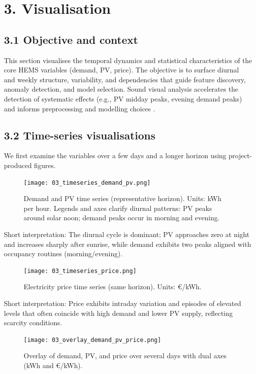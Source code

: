 \documentclass[12pt,a4paper]{article}
\begin{document}
\section*{3. Visualisation}

\subsection*{3.1 Objective and context}
This section visualises the temporal dynamics and statistical characteristics of the core HEMS variables (demand, PV, price). The objective is to surface diurnal and weekly structure, variability, and dependencies that guide feature discovery, anomaly detection, and model selection. Sound visual analysis accelerates the detection of systematic effects (e.g., PV midday peaks, evening demand peaks) and informs preprocessing and modelling choices \cite{Hyndman2021,Tufte1983}.

\subsection*{3.2 Time-series visualisations}
We first examine the variables over a few days and a longer horizon using project-produced figures.

\begin{figure}[H]
  \centering
  \texttt{[image: 03\_timeseries\_demand\_pv.png]}
  \caption{Demand and PV time series (representative horizon). Units: kWh per hour. Legends and axes clarify diurnal patterns: PV peaks around solar noon; demand peaks occur in morning and evening.}
  \label{fig:03_ts_demand_pv}
\end{figure}

Short interpretation: The diurnal cycle is dominant; PV approaches zero at night and increases sharply after sunrise, while demand exhibits two peaks aligned with occupancy routines (morning/evening).

\begin{figure}[H]
  \centering
  \texttt{[image: 03\_timeseries\_price.png]}
  \caption{Electricity price time series (same horizon). Units: \euro{}/kWh.}
  \label{fig:03_ts_price}
\end{figure}

Short interpretation: Price exhibits intraday variation and episodes of elevated levels that often coincide with high demand and lower PV supply, reflecting scarcity conditions.

\begin{figure}[H]
  \centering
  \texttt{[image: 03\_overlay\_demand\_pv\_price.png]}
  \caption{Overlay of demand, PV, and price over several days with dual axes (kWh and \euro{}/kWh).}
  \label{fig:03_overlay}
\end{figure}
\end{document}
